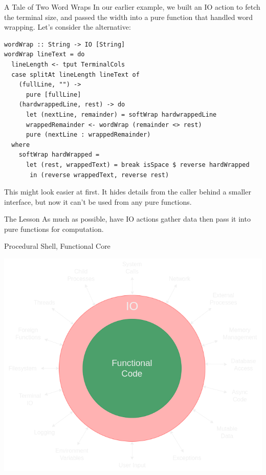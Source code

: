 \documentclass[10pt, presentation, colorlinks]{beamer}
\begin{document}
\begin{frame}[label={sec:org008d2f8},fragile]{A Tale of Two Word Wraps}
 In our earlier example, we built an IO action to fetch the terminal size, and passed the width into a \alert{pure function} that handled word wrapping. Let's consider the alternative:

\pause

\begin{verbatim}
wordWrap :: String -> IO [String]
wordWrap lineText = do
  lineLength <- tput TerminalCols
  case splitAt lineLength lineText of
    (fullLine, "") ->
      pure [fullLine]
    (hardwrappedLine, rest) -> do
      let (nextLine, remainder) = softWrap hardwrappedLine
      wrappedRemainder <- wordWrap (remainder <> rest)
      pure (nextLine : wrappedRemainder)
  where
    softWrap hardWrapped =
      let (rest, wrappedText) = break isSpace $ reverse hardWrapped
       in (reverse wrappedText, reverse rest)
\end{verbatim}

\pause
This might look \alert{easier} at first. It hides details from the caller
behind a smaller interface, but now it can't be used from any pure
functions.
\end{frame}

\begin{frame}[label={sec:org3841477}]{The Lesson}
As much as possible, have IO actions gather data then pass it into
pure functions for computation.
\end{frame}

\begin{frame}[label={sec:org7271f1c}]{Procedural Shell, Functional Core}
\begin{center}
\includegraphics[height=0.6\textheight]{./img/functional-core.png}
\end{center}
\end{frame}
\end{document}
